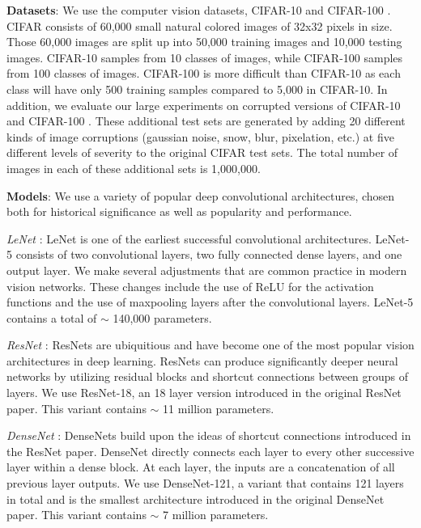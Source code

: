 \documentclass[letterpaper]{article} %
\begin{document}
\textbf{Datasets}: We use the computer vision datasets, CIFAR-10 and CIFAR-100 \cite{krizhevsky2012learning}. CIFAR consists of 60,000 small natural colored images of 32x32 pixels in size. Those 60,000 images are split up into 50,000 training images and 10,000 testing images. CIFAR-10 samples from 10 classes of images, while CIFAR-100 samples from 100 classes of images. CIFAR-100 is more difficult than CIFAR-10 as each class will have only 500 training samples compared to 5,000 in CIFAR-10. In addition, we evaluate our large experiments on corrupted versions of CIFAR-10 and CIFAR-100 \cite{hendrycks2019robustness}. These additional test sets are generated by adding 20 different kinds of image corruptions (gaussian noise, snow, blur, pixelation, etc.) at five different levels of severity to the original CIFAR test sets. The total number of images in each of these additional sets is 1,000,000.

\textbf{Models}: We use a variety of popular deep convolutional architectures, chosen both for historical significance as well as popularity and performance.

\textit{LeNet} \cite{lecun1989backpropagation}: LeNet is one of the earliest successful convolutional architectures. LeNet-5 consists of two convolutional layers, two fully connected dense layers, and one output layer. 
We make several adjustments that are common practice in modern vision networks. These changes include the use of ReLU for the activation functions and the use of maxpooling layers after the convolutional layers. LeNet-5 contains a total of $\sim$ 140,000 parameters.

\textit{ResNet} \cite{he2015deep}: ResNets are ubiquitious and have become one of the most popular vision architectures in deep learning. ResNets can produce significantly deeper neural networks by utilizing residual blocks and shortcut connections between groups of layers. We use ResNet-18, an 18 layer version introduced in the original ResNet paper. This variant contains $\sim$ 11 million parameters.

\textit{DenseNet} \cite{huang2018densely}: DenseNets build upon the ideas of shortcut connections introduced in the ResNet paper. DenseNet directly connects each layer to every other successive layer within a dense block. At each layer, the inputs are a concatenation of all previous layer outputs. We use DenseNet-121, a variant that contains 121 layers in total and is the smallest architecture introduced in the original DenseNet paper. This variant contains  $\sim$ 7 million parameters.
\end{document}
